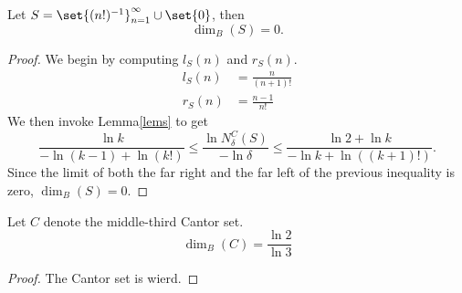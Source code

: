 \begin{example}
	Let $S=\set{(n!)^{-1}}_{n=1}^\infty\cup\set{0}$, then
	\[
		\dim_B(S)=0.
	\]
\end{example}
\begin{proof}
	We begin by computing $l_S(n)$ and $r_S(n)$.
	\begin{align*}
		l_S(n) &= \frac{n}{(n+1)!}\\
		r_S(n) &= \frac{n-1}{n!}
	\end{align*}
	We then invoke Lemma\autoref{lems} to get
	\[
		\frac{\ln k}{-\ln (k-1)+\ln(k!)} \leq \frac{\ln N^C_\delta(S)}{-\ln\delta} \leq \frac{\ln 2+\ln k}{-\ln k +\ln ((k+1)!)}.
	\]
	Since the limit of both the far right and the far left of the previous inequality is zero, $\dim_B(S)=0$.
\end{proof}

\begin{example}
	Let $C$ denote the middle-third Cantor set.
	\[
		\dim_B(C)=\frac{\ln2}{\ln3}
	\]
\end{example}
\begin{proof}
	The Cantor set is wierd.
\end{proof}

